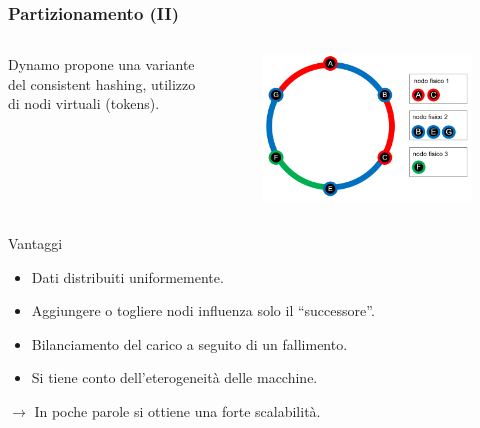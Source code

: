 \begin{frame}
  \frametitle{Partizionamento (II)}
  \begin{columns}
  \begin{column}{0.5\textwidth}
  Dynamo propone una variante del consistent hashing, utilizzo di \alert{nodi virtuali} (tokens).
  \end{column}
  \begin{column}{0.5\textwidth}
  \begin{figure}
  \centering
  \includegraphics[scale=0.23]{dynamo/virtual-node.png}
  \end{figure}
  \end{column}
  \end{columns}
  \begin{block}{Vantaggi}
  \begin{itemize}
  \item Dati distribuiti uniformemente.
  \item Aggiungere o togliere nodi influenza solo il ``successore''.
  \item Bilanciamento del carico a seguito di un fallimento.
  \item Si tiene conto dell'eterogeneità delle macchine.
  \end{itemize}
  $\longrightarrow$ In poche parole si ottiene una forte \alert{scalabilità}.
  \end{block}
\end{frame}


